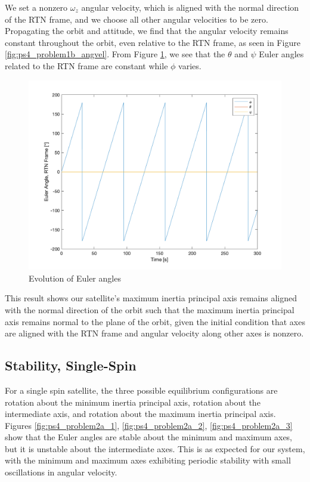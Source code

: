 We set a nonzero $\omega_z$ angular velocity, which is aligned with the normal direction of the RTN frame, and we choose all other angular velocities to be zero. Propagating the orbit and attitude, we find that the angular velocity remains constant throughout the orbit, even relative to the RTN frame, as seen in Figure \ref{fig:ps4_problem1b_angvel}. From Figure \ref{fig:ps4_problem1b_euler}, we see that the $\theta$ and $\psi$ Euler angles related to the RTN frame are constant while $\phi$ varies.

\begin{figure}[H]
\centering
\includegraphics[scale=0.6]{Images/ps4_problem1b_euler.png}
\caption{Evolution of Euler angles}
\label{fig:ps4_problem1b_euler}
\end{figure}

This result shows our satellite's maximum inertia principal axis remains aligned with the normal direction of the orbit such that the maximum inertia principal axis remains normal to the plane of the orbit, given the initial condition that axes are aligned with the RTN frame and angular velocity along other axes is nonzero.

\subsection{Stability, Single-Spin}
For a single spin satellite, the three possible equilibrium configurations are rotation about the minimum inertia principal axis, rotation about the intermediate axis, and rotation about the maximum inertia principal axis. Figures \ref{fig:ps4_problem2a_1}, \ref{fig:ps4_problem2a_2}, \ref{fig:ps4_problem2a_3} show that the Euler angles are stable about the minimum and maximum axes, but it is unstable about the intermediate axes. This is as expected for our system, with the minimum and maximum axes exhibiting periodic stability with small oscillations in angular velocity.

